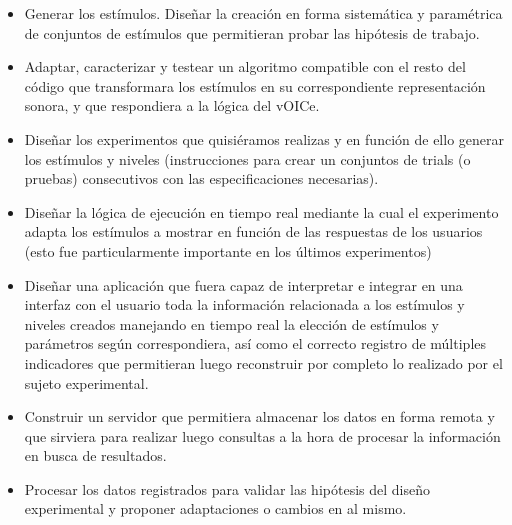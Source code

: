 \documentclass{article}
\begin{document}
    \begin{itemize}
        \item Generar los estímulos. Diseñar la creación en forma sistemática y paramétrica de conjuntos de estímulos que permitieran probar las hipótesis de trabajo. 
        \item Adaptar, caracterizar y testear un algoritmo compatible con el resto del código que transformara los estímulos en su correspondiente representación sonora, y que respondiera a la lógica del vOICe. 
        \item Diseñar los experimentos que quisiéramos realizas y en función de ello generar los estímulos y niveles (instrucciones para crear un conjuntos de trials (o pruebas) consecutivos con las especificaciones necesarias).
        \item Diseñar la lógica de ejecución en tiempo real mediante la cual el experimento adapta los estímulos a mostrar en función de las respuestas de los usuarios (esto fue particularmente importante en los últimos experimentos)
        \item Diseñar una aplicación que fuera capaz de interpretar e integrar en una interfaz con el usuario toda la información relacionada a los estímulos y niveles creados manejando en tiempo real la elección de estímulos y parámetros según correspondiera, así como el correcto registro de múltiples indicadores que permitieran luego reconstruir por completo lo realizado por el sujeto experimental. 
        \item Construir un servidor que permitiera almacenar los datos en forma remota y que sirviera para realizar luego consultas a la hora de procesar la información en busca de resultados.
        \item Procesar los datos registrados para validar las hipótesis del diseño experimental y proponer adaptaciones o cambios en al mismo. 
    \end{itemize}
    
\end{document}
